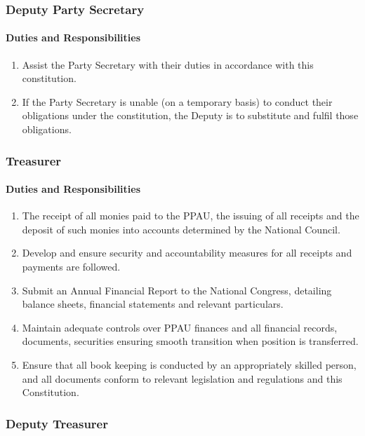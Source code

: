 \documentclass[a4paper,titlepage,8.5pt]{article}
\begin{document}
\subsubsection{Deputy Party Secretary}

\paragraph{Duties and Responsibilities}

\begin{enumerate}
\item Assist the Party Secretary with their duties in accordance with this constitution.
\item If the Party Secretary is unable (on a temporary basis) to conduct their obligations under the constitution, the Deputy is to substitute and fulfil those obligations.
\end{enumerate}

\subsubsection{Treasurer}

\paragraph{Duties and Responsibilities}

\begin{enumerate}
\item The receipt of all monies paid to the PPAU, the issuing of all receipts and the deposit of such monies into accounts determined by the National Council.
\item Develop and ensure security and accountability measures for all receipts and payments are followed.
\item Submit an Annual Financial Report to the National Congress, detailing balance sheets, financial statements and relevant particulars.
\item Maintain adequate controls over PPAU finances and all financial records, documents, securities ensuring smooth transition when position is transferred.
\item Ensure that all book keeping is conducted by an appropriately skilled person, and all documents conform to relevant legislation and regulations and this Constitution.
\end{enumerate}

\subsubsection{Deputy Treasurer}
\end{document}

